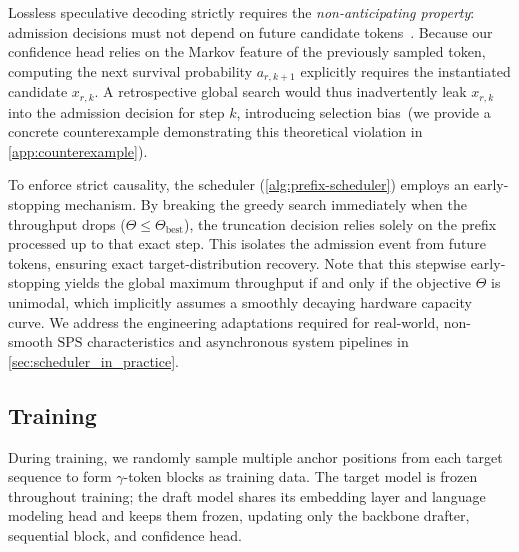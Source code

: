Lossless speculative decoding strictly requires the \textit{non-anticipating property}: admission decisions must not depend on future candidate tokens~\citep{pmlr-v202-leviathan23a,chen2023accelerating}. Because our confidence head relies on the Markov feature of the previously sampled token, computing the next survival probability $a_{r,k+1}$ explicitly requires the instantiated candidate $x_{r,k}$. A retrospective global search would thus inadvertently leak $x_{r,k}$ into the admission decision for step $k$, introducing selection bias~(we provide a concrete counterexample demonstrating this theoretical violation in \autoref{app:counterexample}).

To enforce strict causality, the scheduler (\autoref{alg:prefix-scheduler}) employs an early-stopping mechanism. By breaking the greedy search immediately when the throughput drops ($\Theta \le \Theta_{\text{best}}$), the truncation decision relies solely on the prefix processed up to that exact step. This isolates the admission event from future tokens, ensuring exact target-distribution recovery. Note that this stepwise early-stopping yields the global maximum throughput if and only if the objective $\Theta$ is unimodal, which implicitly assumes a smoothly decaying hardware capacity curve. We address the engineering adaptations required for real-world, non-smooth $\text{SPS}$ characteristics and asynchronous system pipelines in \autoref{sec:scheduler_in_practice}.

\subsection{Training}
\label{sec:training}

During training, we randomly sample multiple anchor positions from each target sequence to form $\gamma$-token blocks as training data.
The target model is frozen throughout training; the draft model shares its embedding layer and language modeling head and keeps them frozen, updating only the backbone drafter, sequential block, and confidence head.

